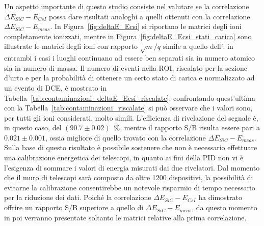 Un aspetto importante di questo studio consiste nel valutare se la correlazione $\Delta E_{SiC} - E_{CsI}$ possa dare risultati analoghi a quelli ottenuti con la correlazione $\Delta E_{SiC} - E_{meas}$. 
In Figura~\ref{fig:deltaE_Ecsi} si riportano le matrici degli ioni completamente ionizzati, mentre in Figura~\ref{fig:deltaE_Ecsi_stati_carica} sono illustrate le matrici degli ioni con rapporto $\sqrt{m}/q$ simile a quello dell': in entrambi i casi i luoghi continuano ad essere ben separati sia in numero atomico sia in numero di massa.
Il numero di eventi nella ROI, riscalato per la sezione d'urto e per la probabilità di ottenere un certo stato di carica e normalizzato ad un evento di DCE, è mostrato in Tabella~\ref{tab:contaminazioni_deltaE_Ecsi_riscalate}: confrontando quest'ultima con la Tabella~\ref{tab:contaminazioni_riscalate} si può osservare che i valori sono, per tutti gli ioni considerati, molto simili.
L'efficienza di rivelazione del segnale è, in questo caso, del $(90.7 \pm 0.02)$~\%, mentre il rapporto S/B risulta essere pari a $0.021 \pm 0.001 $, ossia migliore di quello trovato con la correlazione $\Delta E_{SiC} - E_{meas}$.
Sulla base di questo risultato è possibile sostenere che non è necessario effettuare una calibrazione energetica dei telescopi, in quanto ai fini della PID non vi è l'esigenza di sommare i valori di energia misurati dai due rivelatori.
Dal momento che il muro di telescopi sarà composto da oltre 1200 dispositivi, la possibilità di evitarne la calibrazione consentirebbe un notevole risparmio di tempo necessario per la riduzione dei dati.
Poiché la correlazione $\Delta E_{SiC} - E_{CsI}$ ha dimostrato offrire un rapporto S/B superiore a quello di $\Delta E_{SiC} - E_{meas}$, da questo momento in poi verranno presentate soltanto le matrici relative alla prima correlazione.

